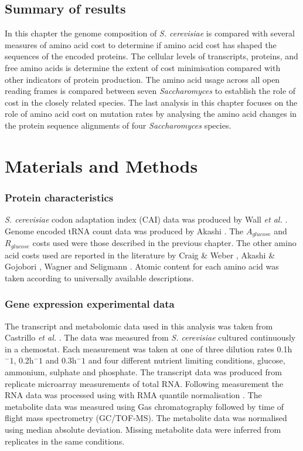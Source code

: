 \subsection{Summary of results}

In this chapter the genome composition of \emph{S. cerevisiae} is compared with several measures of amino acid cost to determine if amino acid cost has shaped the sequences of the encoded proteins. The cellular levels of transcripts, proteins, and free amino acids is determine the extent of cost minimisation compared with other indicators of protein production. The amino acid usage across all open reading frames is compared between seven \emph{Saccharomyces} to establish the role of cost in the closely related species. The last analysis in this chapter focuses on the role of amino acid cost on mutation rates by analysing the amino acid changes in the protein sequence alignments of four \emph{Saccharomyces} species.

\clearpage

\section{Materials and Methods}

\subsubsection{Protein characteristics}

\emph{S. cerevisiae} codon adaptation index (CAI) data was produced by Wall \emph{et al.} \cite{wall2005}. Genome encoded tRNA count data was produced by Akashi \cite{akashi2003}. The $A_{glucose}$ and $R_{glucose}$ costs used were those described in the previous chapter. The other amino acid costs used are reported in the literature by Craig \& Weber \cite{craig1998}, Akashi \& Gojobori \cite{akashi2002}, Wagner \cite{wagner2005} and Seligmann \cite{seligmann2003}. Atomic content for each amino acid was taken according to universally available descriptions.

\subsubsection{Gene expression experimental data}

The transcript and metabolomic data used in this analysis was taken from Castrillo \emph{et al.} \cite{castrillo2007}. The data was measured from \emph{S. cerevisiae} cultured continuously in a chemostat. Each measurement was taken at one of three dilution rates 0.1h$^-1$, 0.2h$^-1$ and 0.3h$^-1$ and four different nutrient limiting conditions, glucose, ammonium, sulphate and phosphate. The transcript data was produced from replicate microarray measurements of total RNA. Following measurement the RNA data was processed using with RMA quantile normalisation \cite{bolstad2003}. The metabolite data was measured using Gas chromatography followed by time of flight mass spectrometry (GC/TOF-MS). The metabolite data was normalised using median absolute deviation. Missing metabolite data were inferred from replicates in the same conditions.

